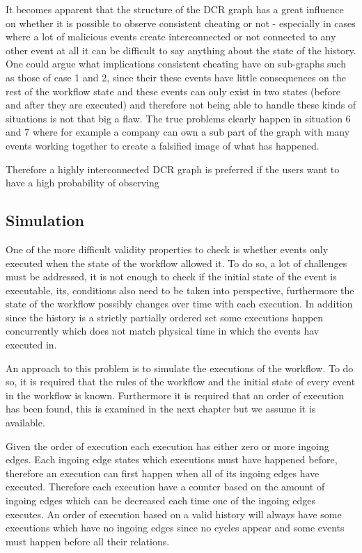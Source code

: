 	\newpar It becomes apparent that the structure of the DCR graph has a great influence on whether it is possible to observe consistent cheating or not - especially in cases where a lot of malicious events create interconnected or not connected to any other event at all it can be difficult to say anything about the state of the history. One could argue what implications consistent cheating have on sub-graphs such as those of case 1 and 2, since their these events have little consequences on the rest of the workflow state and these events can only exist in two states (before and after they are executed) and therefore not being able to handle these kinds of situations is not that big a flaw. The true problems clearly happen in situation 6 and 7 where for example a company can own a sub part of the graph with many events working together to create a falsified image of what has happened. 
	
	\newpar Therefore a highly interconnected DCR graph is preferred if the users want to have a high probability of observing 

    \subsection{Simulation}\label{sec:historyindcr:simulation}
    One of the more difficult validity properties to check is whether events only executed when the state of the workflow allowed it. To do so, a lot of challenges must be addressed, it is not enough to check if the initial state of the event is executable, its, conditions also need to be taken into perspective, furthermore the state of the workflow possibly changes over time with each execution. In addition since the history is a strictly partially ordered set some executions happen concurrently which does not match physical time in which the events hav executed in.
    
    \newpar An approach to this problem is to simulate the executions of the workflow. To do so, it is required that the rules of the workflow and the initial state of every event in the workflow is known. Furthermore it is required that an order of execution has been found, this is examined in the next chapter but we assume it is available. 
    
    Given the order of execution each execution has either zero or more ingoing edges. Each ingoing edge states which executions must have happened before, therefore an execution can first happen when all of its ingoing edges have executed. Therefore each execution have a counter based on the amount of ingoing edges which can be decreased each time one of the ingoing edges executes. An order of execution based on a valid history will always have some executions which have no ingoing edges since no cycles appear and some events must happen before all their relations. 
    
